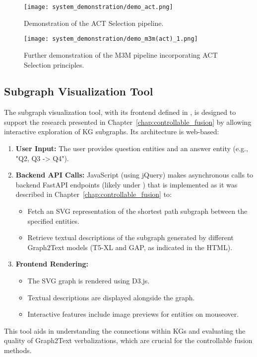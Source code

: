 \begin{figure}[htb]
    \centering
    \texttt{[image: system\_demonstration/demo\_act.png]}
    \caption{Demonstration of the ACT Selection pipeline.}
    \label{fig:demo_act}
\end{figure}

\begin{figure}[htb]
    \centering
    \texttt{[image: system\_demonstration/demo\_m3m(act)\_1.png]}
    \caption{Further demonstration of the M3M pipeline incorporating ACT Selection principles.}
    \label{fig:demo_m3m_act_1}
\end{figure}

\subsection{Subgraph Visualization Tool}
The subgraph visualization tool, with its frontend defined in , is designed to support the research presented in Chapter~\ref{chap:controllable_fusion} by allowing interactive exploration of KG subgraphs. Its architecture is web-based:
\begin{enumerate}
    \item \textbf{User Input:} The user provides question entities and an answer entity (e.g., "Q2, Q3 -> Q4").
    \item \textbf{Backend API Calls:} JavaScript (using jQuery) makes asynchronous calls to backend FastAPI endpoints (likely under ) that is implemented as it was described in Chapter~\ref{chap:controllable_fusion} to:
    \begin{itemize}
        \item Fetch an SVG representation of the shortest path subgraph between the specified entities.
        \item Retrieve textual descriptions of the subgraph generated by different Graph2Text models (T5-XL and GAP, as indicated in the HTML).
    \end{itemize}
    \item \textbf{Frontend Rendering:}
    \begin{itemize}
        \item The SVG graph is rendered using D3.js.
        \item Textual descriptions are displayed alongside the graph.
        \item Interactive features include image previews for entities on mouseover.
    \end{itemize}
\end{enumerate}
This tool aids in understanding the connections within KGs and evaluating the quality of Graph2Text verbalizations, which are crucial for the controllable fusion methods.

